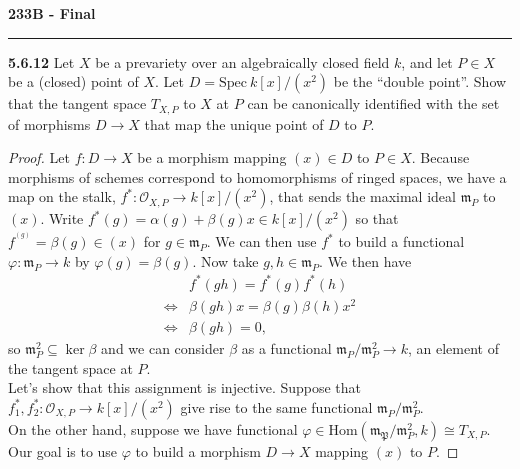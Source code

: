 \documentclass[11pt,letterpaper]{report}
\newcommand{\mcal}[1]{\mathcal{#1}}
\newcommand{\Hom}{\text{Hom}}
\newcommand{\Spec}{\text{Spec}}
\begin{document}
\begin{center}
{\bf \Large 233B - Final} %
\vspace{0.2cm}
\hrule
\end{center}



\noindent\textbf{5.6.12}
Let $X$ be a prevariety over an algebraically closed field $k$, and let $P\in X$ be a (closed) point of $X$. Let $D = \Spec\ k[x]/(x^2)$ be the ``double point''. Show that the tangent space $T_{X,P}$ to $X$ at $P$ can be canonically identified with the set of morphisms $D\to X$ that map the unique point of $D$ to $P$.
\begin{proof}
	Let $f:D\to X$ be a morphism mapping $(x)\in D$ to $P\in X$. Because morphisms of schemes correspond to homomorphisms of ringed spaces, we have a map on the stalk, $f^*: \mcal{O}_{X, P}\to k[x]/(x^2)$, that sends the maximal ideal $\mathfrak{m}_P$ to $(x)$. Write $f^*(g) = \alpha(g) + \beta(g)x\in k[x]/(x^2)$ so that $f^^(g) = \beta(g)\in (x)$ for $g\in \mathfrak{m}_P$.  We can then use $f^*$ to build a functional $\varphi: \mathfrak{m}_P\to k$ by $\varphi(g) = \beta(g)$. Now take $g,h\in \mathfrak{m}_P$. We then have
	\begin{align*}
		&f^*(gh) = f^*(g)f^*(h)\\
		\iff& \beta(gh)x = \beta(g)\beta(h)x^2\\
		\iff&\beta(gh) = 0,
	\end{align*}
	so $\mathfrak{m}_P^2\subseteq \ker \beta$ and we can consider $\beta$ as a functional $\mathfrak{m}_P/\mathfrak{m}_P^2\to k$, an element of the tangent space at $P$.\\

	\noindent Let's show that this assignment is injective. Suppose that $f_1^*, f_2^*: \mcal{O}_{X, P}\to k[x]/(x^2)$ give rise to the same functional $\mathfrak{m}_P/\mathfrak{m}_P^2$.\\

	\noindent On the other hand, suppose we have functional $\varphi\in \Hom(\mathfrak{m_P}/\mathfrak{m}_P^2, k) \cong T_{X, P}$. Our goal is to use $\varphi$ to build a morphism $D\to X$ mapping $(x)$ to $P$.
\end{proof}
\end{document}
